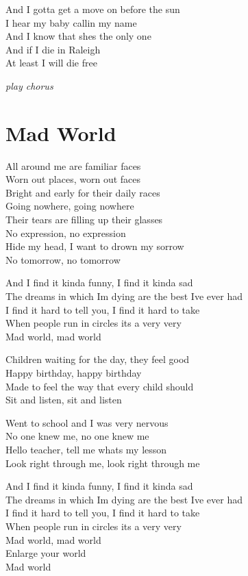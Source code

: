 \documentclass[
  letterpaper,
  a5paper]{memoir}
\begin{document}
And I gotta get a move on before the sun\\
I hear my baby callin\textquotesingle{} my name\\
And I know that she\textquotesingle s the only one\\
And if I die in Raleigh\\
At least I will die free

\emph{play chorus}

\hypertarget{mad-world}{%
\chapter{Mad World}\label{mad-world}}

All around me are familiar faces\\
Worn out places, worn out faces\\
Bright and early for their daily races\\
Going nowhere, going nowhere\\
Their tears are filling up their glasses\\
No expression, no expression\\
Hide my head, I want to drown my sorrow\\
No tomorrow, no tomorrow

And I find it kinda funny, I find it kinda sad\\
The dreams in which I\textquotesingle m dying are the best
I\textquotesingle ve ever had\\
I find it hard to tell you, I find it hard to take\\
When people run in circles it\textquotesingle s a very very\\
Mad world, mad world

Children waiting for the day, they feel good\\
Happy birthday, happy birthday\\
Made to feel the way that every child should\\
Sit and listen, sit and listen

Went to school and I was very nervous\\
No one knew me, no one knew me\\
Hello teacher, tell me what\textquotesingle s my lesson\\
Look right through me, look right through me

And I find it kinda funny, I find it kinda sad\\
The dreams in which I\textquotesingle m dying are the best
I\textquotesingle ve ever had\\
I find it hard to tell you, I find it hard to take\\
When people run in circles it\textquotesingle s a very very\\
Mad world, mad world\\
Enlarge your world\\
Mad world
\end{document}
